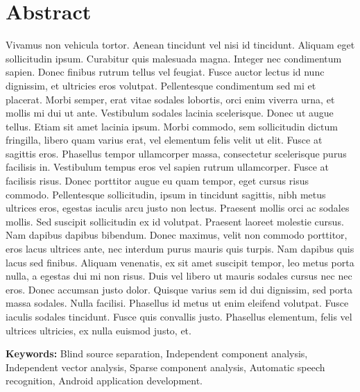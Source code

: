 
\chapter*{Abstract}
Vivamus non vehicula tortor. Aenean tincidunt vel nisi id tincidunt. Aliquam eget sollicitudin ipsum. Curabitur quis malesuada magna. Integer nec condimentum sapien. Donec finibus rutrum tellus vel feugiat. Fusce auctor lectus id nunc dignissim, et ultricies eros volutpat. Pellentesque condimentum sed mi et placerat. Morbi semper, erat vitae sodales lobortis, orci enim viverra urna, et mollis mi dui ut ante. Vestibulum sodales lacinia scelerisque. Donec ut augue tellus. Etiam sit amet lacinia ipsum. Morbi commodo, sem sollicitudin dictum fringilla, libero quam varius erat, vel elementum felis velit ut elit. Fusce at sagittis eros. Phasellus tempor ullamcorper massa, consectetur scelerisque purus facilisis in. Vestibulum tempus eros vel sapien rutrum ullamcorper. Fusce at facilisis risus. Donec porttitor augue eu quam tempor, eget cursus risus commodo. Pellentesque sollicitudin, ipsum in tincidunt sagittis, nibh metus ultrices eros, egestas iaculis arcu justo non lectus. Praesent mollis orci ac sodales mollis. Sed suscipit sollicitudin ex id volutpat. Praesent laoreet molestie cursus. Nam dapibus dapibus bibendum. Donec maximus, velit non commodo porttitor, eros lacus ultrices ante, nec interdum purus mauris quis turpis. Nam dapibus quis lacus sed finibus. Aliquam venenatis, ex sit amet suscipit tempor, leo metus porta nulla, a egestas dui mi non risus. Duis vel libero ut mauris sodales cursus nec nec eros. Donec accumsan justo dolor. Quisque varius sem id dui dignissim, sed porta massa sodales. Nulla facilisi. Phasellus id metus ut enim eleifend volutpat. Fusce iaculis sodales tincidunt. Fusce quis convallis justo. Phasellus elementum, felis vel ultrices ultricies, ex nulla euismod justo, et.
\\
\par
\textbf{Keywords:} Blind source separation, Independent component analysis, Independent vector analysis, Sparse component analysis, Automatic speech recognition, Android application development.

